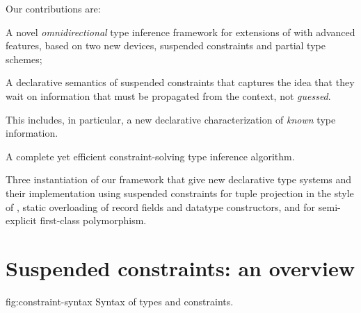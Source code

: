 \documentclass[acmsmall,screen,nonacm,review]{acmart}
\begin{document}
Our contributions are:
\begin{enumerate*}
\item
  A novel \emph{omnidirectional} type inference framework for
  extensions of \ML with advanced features, based on two new devices,
  suspended constraints and partial type schemes;

\item A declarative semantics of suspended constraints that captures the
  idea that they wait on information that must be propagated from the
  context, not \emph{guessed}.

  This includes, in particular, a new declarative characterization of
  \emph{known} type information.

\item
  A complete yet efficient constraint-solving type inference algorithm.

\item
  Three instantiation of our framework that give new declarative type
  systems and their implementation using suspended constraints for tuple
  projection in the style of \SML, static overloading of record fields and
  datatype constructors, and for semi-explicit first-class polymorphism.

\end{enumerate*}

\section{Suspended constraints: an overview}
\label{sec:constraints}

\begin{bnffig}[t]%
  {fig:constraint-syntax}%
  {Syntax of types and constraints.}
\\
\entry[Types]{\t}{
    \tv \and
    \tunit \and
    \ta \to \tb \color{gray} \and
    \Pi\iton \ti \and
    \T \tys \and
    \tpoly \ts
}\\
\\[1ex]
\entry[Constraints]{\c}{
        \ctrue
  \and  \cfalse
  \and  \ca \cand \cb
  \and  \cexists \tv \c
  \and 	\cfor \tv \c
  \and  \cunif \ta \tb
  \nextline
  \and  \clet \x \tv \ca \cb
  \and  \capp \x \t
  \nextline
  \and  \cmatch \t \cbrs
}\\[1ex]
\entry[Branches]{\cbr}{\cbranch \cpat \c} \\
\entry[Patterns]{\cpat}{}{} \\[1ex]
 \\
\entry[Shapes] {\Sh} {} {}
\\
 {} {}
\end{bnffig}
\end{document}
